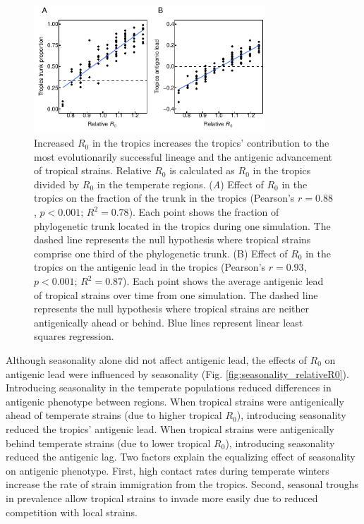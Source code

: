 \documentclass[10pt]{article}
\begin{document}
\begin{figure}[h!]
\centerline{\includegraphics[width=3.42in]{./manuscript/figures/relativeR0/relativeR0.pdf}}
\caption{Increased $R_0$ in the tropics increases the tropics' contribution to the most evolutionarily successful lineage and the antigenic advancement of tropical strains. 
Relative $R_0$ is calculated as $R_{0}$ in the tropics divided by $R_{0}$ in the temperate regions. 
(\textit{A}) Effect of $R_0$ in the tropics on the fraction of the trunk in the tropics (Pearson's $r = 0.88$, $p < 0.001$; $R^2 = 0.78$). 
Each point shows the fraction of phylogenetic trunk located in the tropics during one simulation. 
The dashed line represents the null hypothesis where tropical strains comprise one third of the phylogenetic trunk. 
(B) Effect of $R_0$ in the tropics on the antigenic lead in the tropics (Pearson's $r = 0.93$, $p < 0.001$; $R^2 = 0.87$).
Each point shows the average antigenic lead of tropical strains over time from one simulation.  
The dashed line represents the null hypothesis where tropical strains are neither antigenically ahead or behind. 
Blue lines represent linear least squares regression.}
\label{fig:relativeR0}
\end{figure}

Although seasonality alone did not affect antigenic lead, the effects of $R_0$ on antigenic lead were influenced by seasonality (Fig. \ref{fig:seasonality_relativeR0}). 
Introducing seasonality in the temperate populations reduced differences in antigenic phenotype between regions. 
When tropical strains were antigenically ahead of temperate strains (due to higher tropical $R_0$), introducing seasonality reduced the tropics' antigenic lead. 
When tropical strains were antigenically behind temperate strains (due to lower tropical $R_0$), introducing seasonality reduced the antigenic lag.
Two factors explain the equalizing effect of seasonality on antigenic phenotype.
First, high contact rates during temperate winters increase the rate of strain immigration from the tropics.
Second, seasonal troughs in prevalence allow tropical strains to invade more easily due to reduced competition with local strains.
\end{document}
